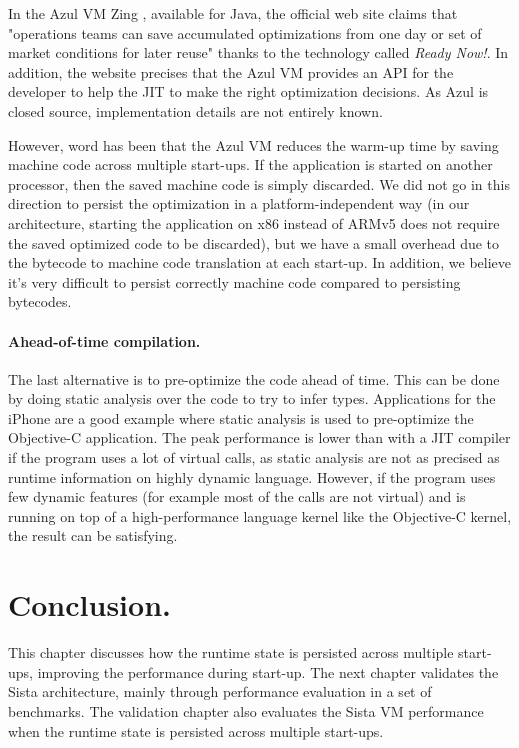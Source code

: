 \documentclass[a4paper,12pt,twoside]{../includes/ThesisStyle}
\begin{document}
In the Azul VM Zing \cite{Azul}, available for Java, the official web site claims that "operations teams can save accumulated optimizations from one day or set of market conditions for later reuse" thanks to the technology called \emph{Ready Now!}. In addition, the website precises that the Azul VM provides an API for the developer to help the JIT to make the right optimization decisions. As Azul is closed source, implementation details are not entirely known. 

However, word has been that the Azul VM reduces the warm-up time by saving machine code across multiple start-ups. If the application is started on another processor, then the saved machine code is simply discarded. We did not go in this direction to persist the optimization in a platform-independent way (in our architecture, starting the application on x86 instead of ARMv5 does not require the saved optimized code to be discarded), but we have a small overhead due to the bytecode to machine code translation at each start-up. In addition, we believe it's very difficult to persist correctly machine code compared to persisting bytecodes.

\paragraph{Ahead-of-time compilation.}

The last alternative is to pre-optimize the code ahead of time. This can be done by doing static analysis over the code to try to infer types. Applications for the iPhone are a good example where static analysis is used to pre-optimize the Objective-C application. The peak performance is lower than with a JIT compiler if the program uses a lot of virtual calls, as static analysis are not as precised as runtime information on highly dynamic language. 
However, if the program uses few dynamic features (for example most of the calls are not virtual) and is running on top of a high-performance language kernel like the Objective-C kernel, the result can be satisfying.

\section{Conclusion.} This chapter discusses how the runtime state is persisted across multiple start-ups, improving the performance during start-up. The next chapter validates the Sista architecture, mainly through performance evaluation in a set of benchmarks. The validation chapter also evaluates the Sista VM performance when the runtime state is persisted across multiple start-ups.

\ifx\wholebook\relax\else
    
\end{document}
